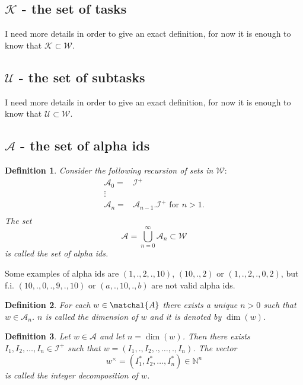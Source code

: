 \documentclass{scrartcl}
\newtheorem{mydef}{Definition}
\begin{document}
\subsection{$\mathcal{K}$ - the set of tasks}
I need more details in order to give an exact definition, for now it is enough to know that $\mathcal{K}\subset\mathcal{W}$.

\subsection{$\mathcal{U}$ - the set of subtasks}
I need more details in order to give an exact definition, for now it is enough to know that $\mathcal{U}\subset\mathcal{W}$.

\subsection{$\mathcal{A}$ - the set of alpha ids}
\begin{mydef}
Consider the following recursion of sets in $\mathcal{W}:$
\begin{equation}
\begin{split}
\mathcal{A}_0= & \mathcal{I}^+\\
\vdots &\\
\mathcal{A}_{n} = &\mathcal{A}_{n-1}.\mathcal{I}^+ \mbox{ for } n>1.\\
\end{split}
\end{equation}
The set $$\mathcal{A}=\bigcup_{n=0}^{\infty}\mathcal{A}_n\subset\mathcal{W}$$ is called the \emph{set of alpha ids}. 
\end{mydef}

Some examples of alpha ids are $(1,.,2,.,10)$, $(10,.,2)$ or $(1,.,2,.,0,2)$, but f.i.  $(10,.,0,.,9,.,10)$ or $(a,.,10,.,b)$ are not valid alpha ids. 

\begin{mydef}
For each $w\in\matchal{A}$ there exists a unique $n>0$ such that $w\in\mathcal{A}_n$. $n$ is called the dimension of $w$ and it is denoted by $\dim(w)$.
\end{mydef}

\begin{mydef}
Let $w\in\mathcal{A}$ and let $n=\dim(w)$. Then there exists $I_1,I_2,\ldots,I_n\in\mathcal{I}^+$ such that $w=(I_1,.,I_2,.,\ldots,.,I_n)$. The vector 
$$w^{\times}=(I_1^{\ast},I_2^{\ast},\ldots,I_n^{\ast})\in\mathbb{N}^n$$ is called the \emph{integer decomposition} of $w$.
\end{mydef}
\end{document}
